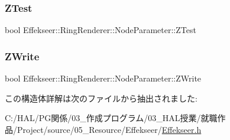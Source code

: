 \subsubsection{\texorpdfstring{Z\+Test}{ZTest}}
{\footnotesize\ttfamily bool Effekseer\+::\+Ring\+Renderer\+::\+Node\+Parameter\+::\+Z\+Test}

\mbox{\label{struct_effekseer_1_1_ring_renderer_1_1_node_parameter_a26d4576d9bb81f221230f178637f352b}} 
\subsubsection{\texorpdfstring{Z\+Write}{ZWrite}}
{\footnotesize\ttfamily bool Effekseer\+::\+Ring\+Renderer\+::\+Node\+Parameter\+::\+Z\+Write}



この構造体詳解は次のファイルから抽出されました\+:\begin{DoxyCompactItemize}
\item 
C\+:/\+H\+A\+L/\+P\+G関係/03\+\_\+作成プログラム/03\+\_\+\+H\+A\+L授業/就職作品/\+Project/source/05\+\_\+\+Resource/\+Effekseer/\mbox{\hyperlink{_effekseer_8h}{Effekseer.\+h}}\end{DoxyCompactItemize}
